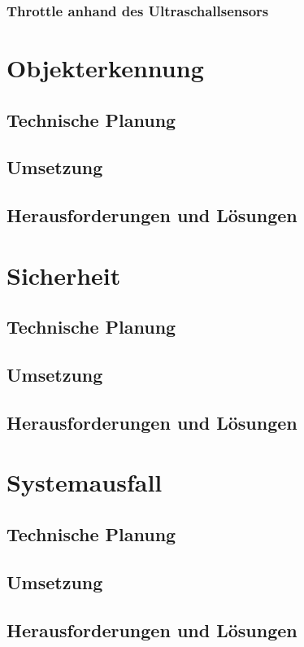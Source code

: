     \subsubsection{Throttle anhand des Ultraschallsensors}

\section{Objekterkennung}

  \subsection{Technische Planung}

  \subsection{Umsetzung}

  \subsection{Herausforderungen und Lösungen}

\section{Sicherheit}

  \subsection{Technische Planung}

  \subsection{Umsetzung}

  \subsection{Herausforderungen und Lösungen}

\section{Systemausfall}

  \subsection{Technische Planung}

  \subsection{Umsetzung}

  \subsection{Herausforderungen und Lösungen}
